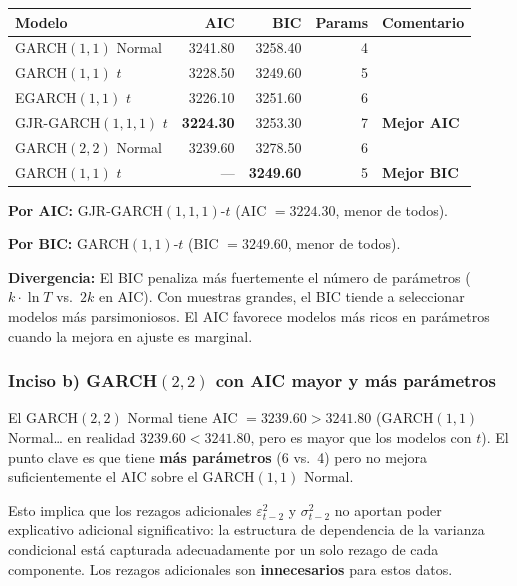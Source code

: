 \documentclass[12pt,a4paper]{article}
\begin{document}
\begin{solucion}
\begin{center}
\begin{tabular}{lrrrl}
\toprule
Modelo & AIC & BIC & Params & Comentario\\
\midrule
GARCH$(1,1)$ Normal & 3241.80 & 3258.40 & 4 & \\
GARCH$(1,1)$ $t$ & 3228.50 & 3249.60 & 5 & \\
EGARCH$(1,1)$ $t$ & 3226.10 & 3251.60 & 6 & \\
GJR-GARCH$(1,1,1)$ $t$ & \textbf{3224.30} & 3253.30 & 7 & \textbf{Mejor AIC}\\
GARCH$(2,2)$ Normal & 3239.60 & 3278.50 & 6 & \\
GARCH$(1,1)$ $t$ & — & \textbf{3249.60} & 5 & \textbf{Mejor BIC}\\
\bottomrule
\end{tabular}
\end{center}

\textbf{Por AIC:} GJR-GARCH$(1,1,1)$-$t$ (AIC $=3224.30$, menor de todos).

\textbf{Por BIC:} GARCH$(1,1)$-$t$ (BIC $=3249.60$, menor de todos).

\textbf{Divergencia:} El BIC penaliza más fuertemente el número de parámetros ($k\cdot\ln T$ vs.\ $2k$ en AIC). Con muestras grandes, el BIC tiende a seleccionar modelos más parsimoniosos. El AIC favorece modelos más ricos en parámetros cuando la mejora en ajuste es marginal.
\end{solucion}

\subsubsection*{Inciso b) GARCH$(2,2)$ con AIC mayor y más parámetros}

\begin{solucion}
El GARCH$(2,2)$ Normal tiene AIC $=3239.60>3241.80$ (GARCH$(1,1)$ Normal… en realidad $3239.60<3241.80$, pero es mayor que los modelos con $t$). El punto clave es que tiene \textbf{más parámetros} (6 vs.\ 4) pero no mejora suficientemente el AIC sobre el GARCH$(1,1)$ Normal.

Esto implica que los rezagos adicionales $\varepsilon_{t-2}^2$ y $\sigma_{t-2}^2$ no aportan poder explicativo adicional significativo: la estructura de dependencia de la varianza condicional está capturada adecuadamente por un solo rezago de cada componente. Los rezagos adicionales son \textbf{innecesarios} para estos datos.
\end{solucion}
\end{document}
